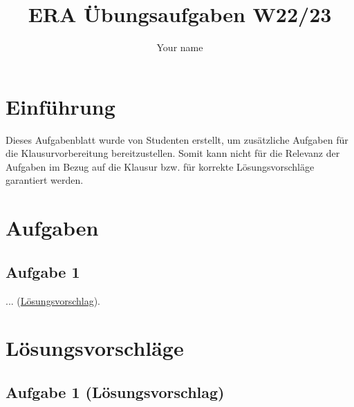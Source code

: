 \documentclass{article}
\title{ERA Übungsaufgaben W22/23}
\author{Your name}
\begin{document}
\maketitle

\section{Einführung}
Dieses Aufgabenblatt wurde von Studenten erstellt, um zusätzliche Aufgaben für die Klausurvorbereitung bereitzustellen. Somit kann nicht für die Relevanz der Aufgaben im Bezug auf die Klausur bzw. für korrekte Lösungsvorschläge garantiert werden.

\section{Aufgaben}

\subsection{Aufgabe 1}
... (\hyperref[sec:lsg01]{Lösungsvorschlag}).

\newpage

\section{Lösungsvorschläge}

\subsection{Aufgabe 1 (Lösungsvorschlag)}
\label{sec:lsg01}
\end{document}
